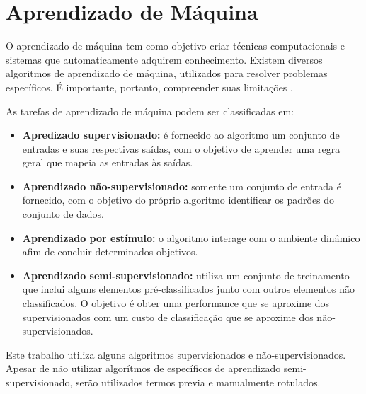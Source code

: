 \clearpage
\chapter{Aprendizado de Máquina}

O aprendizado de máquina tem como objetivo criar técnicas computacionais e sistemas que automaticamente adquirem conhecimento. Existem diversos algoritmos de aprendizado de máquina, utilizados para resolver problemas específicos. É importante, portanto, compreender suas limitações \cite{rezende2003}.

As tarefas de aprendizado de máquina podem ser classificadas em:

\begin{itemize}
    \item \textbf{Apredizado supervisionado:} é fornecido ao algoritmo um conjunto de entradas e suas respectivas saídas, com o objetivo de aprender uma regra geral que mapeia as entradas às saídas.
    \item \textbf{Aprendizado não-supervisionado:} somente um conjunto de entrada é fornecido, com o objetivo do próprio algoritmo identificar os padrões do conjunto de dados.
    \item \textbf{Aprendizado por estímulo:} o algoritmo interage com o ambiente dinâmico afim de concluir determinados objetivos.
    \item \textbf{Aprendizado semi-supervisionado:} utiliza um conjunto de treinamento que inclui alguns elementos pré-classificados junto com outros elementos não classificados. O objetivo é obter uma performance que se aproxime dos supervisionados com um custo de classificação que se aproxime dos não-supervisionados.
\end{itemize}

Este trabalho utiliza alguns algoritmos supervisionados e não-supervisionados. Apesar de não utilizar algorítmos de específicos de aprendizado semi-supervisionado, serão utilizados termos previa e manualmente rotulados.






